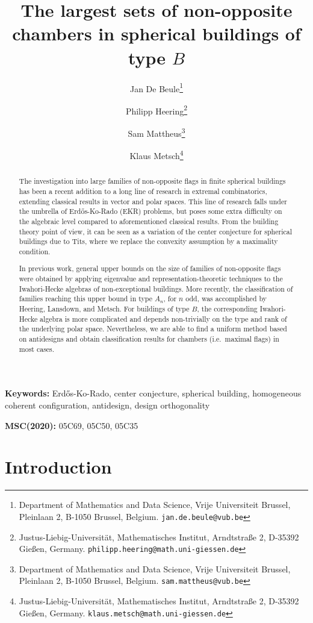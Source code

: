 \documentclass[11pt]{article}
\title{The largest sets of non-opposite chambers in spherical buildings of type $B$}
\author{
  Jan De Beule\thanks{Department of Mathematics and Data Science, Vrije Universiteit Brussel, Pleinlaan 2, B-1050 Brussel, Belgium. \texttt{jan.de.beule@vub.be}} \and
  Philipp Heering\thanks{Justus-Liebig-Universität, Mathematisches Institut, Arndtstraße 2, D-35392 Gießen, Germany. \texttt{philipp.heering@math.uni-giessen.de}} \and
Sam Mattheus\thanks{Department of Mathematics and Data Science, Vrije Universiteit Brussel, Pleinlaan 2, B-1050 Brussel, Belgium. \texttt{sam.mattheus@vub.be}} \and
  Klaus Metsch\footnotemark[2]\thanks{Justus-Liebig-Universität, Mathematisches Institut, Arndtstraße 2, D-35392 Gießen, Germany.  \texttt{klaus.metsch@math.uni-giessen.de}}
}
\begin{document}
\maketitle

\begin{abstract}

The investigation into large families of non-opposite flags in finite spherical buildings has been a recent addition to a long line of research in extremal combinatorics, extending classical results in vector and polar spaces. This line of research falls under the umbrella of Erd\H{o}s-Ko-Rado (EKR) problems, but poses some extra difficulty on the algebraic level compared to aforementioned classical results. From the building theory point of view, it can be seen as a variation of the center conjecture for spherical buildings due to Tits, where we replace the convexity assumption by a maximality condition.

In previous work, general upper bounds on the size of families of non-opposite flags were obtained by applying eigenvalue and representation-theoretic techniques to the Iwahori-Hecke algebras of non-exceptional buildings. More recently, the classification of families reaching this upper bound in type $A_n$, for $n$ odd, was accomplished by Heering, Lansdown, and Metsch. For buildings of type $B$, the corresponding Iwahori-Hecke algebra is more complicated and depends non-trivially on the type and rank of the underlying polar space. Nevertheless, we are able to find a uniform method based on antidesigns and obtain classification results for chambers (i.e.\ maximal flags) in most cases. 
\end{abstract}



\textbf{Keywords:}  Erd\H{o}s-Ko-Rado, center conjecture, spherical building, homogeneous coherent configuration, antidesign, design orthogonality

\textbf{MSC(2020):} 
05C69, %
05C50, %
05C35 %





\section{Introduction}
\end{document}

